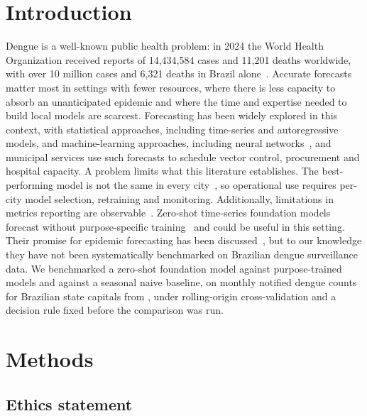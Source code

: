 \documentclass[10pt,letterpaper]{article}
\begin{document}
\clearpage
{}
\linenumbers

\section*{Introduction}

Dengue is a well-known public health problem: in 2024 the World Health Organization received reports of 14,434,584 cases and 11,201 deaths worldwide, with over 10 million cases and 6,321 deaths in Brazil alone~\cite{WHO2025wer}. Accurate forecasts matter most in settings with fewer resources, where there is less capacity to absorb an unanticipated epidemic and where the time and expertise needed to build local models are scarcest. Forecasting has been widely explored in this context, with statistical approaches, including time-series and autoregressive models, and machine-learning approaches, including neural networks~\cite{Leung2023}, and municipal services use such forecasts to schedule vector control, procurement and hospital capacity. A problem limits what this literature establishes. The best-performing model is not the same in every city~\cite{Roster2022}, so operational use requires per-city model selection, retraining and monitoring. Additionally, limitations in metrics reporting are observable~\cite{Leung2023}. Zero-shot time-series foundation models forecast without purpose-specific training~\cite{Das2024timesfm} and could be useful in this setting. Their promise for epidemic forecasting has been discussed~\cite{Lau2026foundation}, but to our knowledge they have not been systematically benchmarked on Brazilian dengue surveillance data. We benchmarked a zero-shot foundation model against  purpose-trained models and against a seasonal naive baseline, on monthly notified dengue counts for  Brazilian state capitals from , under rolling-origin cross-validation and a decision rule fixed before the comparison was run.

\section*{Methods}

\subsection*{Ethics statement}
\end{document}
